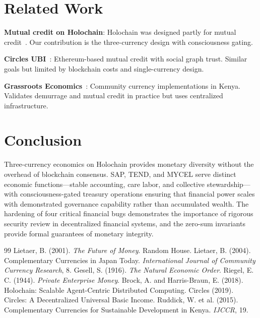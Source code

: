 \documentclass[11pt,twocolumn]{article}
\begin{document}
\section{Related Work}

\textbf{Mutual credit on Holochain}: Holo\-chain was designed partly for
mutual credit~\cite{brock2018}. Our contribution is the three-currency
design with consciousness gating.

\textbf{Circles UBI}~\cite{circles2019}: Ethereum-based mutual credit with
social graph trust. Similar goals but limited by blockchain costs and
single-currency design.

\textbf{Grassroots Economics}~\cite{ruddick2015}: Community currency
implementations in Kenya. Validates demurrage and mutual credit in practice
but uses centralized infrastructure.

\section{Conclusion}

Three-currency economics on Holochain provides monetary diversity without
the overhead of blockchain consensus. SAP, TEND, and MYCEL serve distinct
economic functions---stable accounting, care labor, and collective
stewardship---with consciousness-gated treasury operations ensuring that
financial power scales with demonstrated governance capability rather than
accumulated wealth. The hardening of four critical financial bugs demonstrates
the importance of rigorous security review in decentralized financial systems,
and the zero-sum invariants provide formal guarantees of monetary integrity.

\begin{thebibliography}{99}
   Lietaer, B. (2001). \textit{The Future of Money}.
    Random House.
   Lietaer, B. (2004). Complementary Currencies in Japan Today.
    \textit{International Journal of Community Currency Research}, 8.
   Gesell, S. (1916). \textit{The Natural Economic Order}.
   Riegel, E. C. (1944). \textit{Private Enterprise Money}.
   Brock, A. and Harris-Braun, E. (2018). Holochain:
    Scalable Agent-Centric Distributed Computing.
   Circles (2019). Circles: A Decentralized Universal Basic Income.
   Ruddick, W. et al. (2015). Complementary Currencies for
    Sustainable Development in Kenya. \textit{IJCCR}, 19.
\end{thebibliography}
\end{document}
